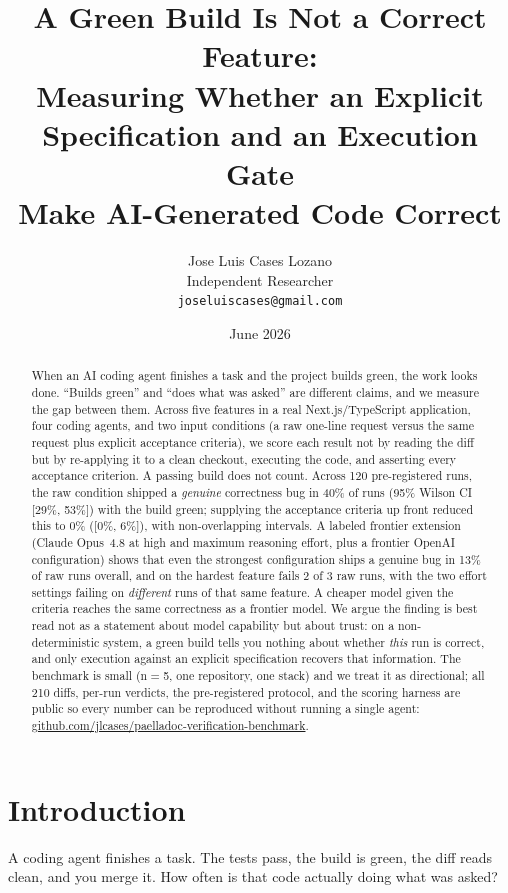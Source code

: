 \documentclass[11pt]{article}
\title{\textbf{A Green Build Is Not a Correct Feature:\\
Measuring Whether an Explicit Specification and an Execution Gate\\
Make AI-Generated Code Correct}}
\author{Jose Luis Cases Lozano\\
\small Independent Researcher\\
\small \texttt{joseluiscases@gmail.com}}
\date{June 2026}
\newcommand{\repo}{\href{https://github.com/jlcases/paelladoc-verification-benchmark}{github.com/jlcases/paelladoc-verification-benchmark}}
\begin{document}
\maketitle

\begin{abstract}
\noindent
When an AI coding agent finishes a task and the project builds green, the work looks done. ``Builds green'' and ``does what was asked'' are different claims, and we measure the gap between them. Across five features in a real Next.js/TypeScript application, four coding agents, and two input conditions (a raw one-line request versus the same request plus explicit acceptance criteria), we score each result not by reading the diff but by re-applying it to a clean checkout, executing the code, and asserting every acceptance criterion. A passing build does not count. Across 120 pre-registered runs, the raw condition shipped a \emph{genuine} correctness bug in 40\% of runs (95\% Wilson CI [29\%, 53\%]) with the build green; supplying the acceptance criteria up front reduced this to 0\% ([0\%, 6\%]), with non-overlapping intervals. A labeled frontier extension (Claude Opus~4.8 at high and maximum reasoning effort, plus a frontier OpenAI configuration) shows that even the strongest configuration ships a genuine bug in 13\% of raw runs overall, and on the hardest feature fails 2 of 3 raw runs, with the two effort settings failing on \emph{different} runs of that same feature. A cheaper model given the criteria reaches the same correctness as a frontier model. We argue the finding is best read not as a statement about model capability but about trust: on a non-deterministic system, a green build tells you nothing about whether \emph{this} run is correct, and only execution against an explicit specification recovers that information. The benchmark is small (n$=$5, one repository, one stack) and we treat it as directional; all 210 diffs, per-run verdicts, the pre-registered protocol, and the scoring harness are public so every number can be reproduced without running a single agent: \repo.
\end{abstract}

\section{Introduction}

A coding agent finishes a task. The tests pass, the build is green, the diff reads clean, and you merge it. How often is that code actually doing what was asked?
\end{document}
